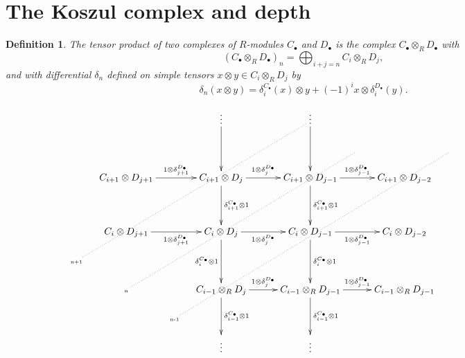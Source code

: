\documentclass[11pt]{book}
\newtheorem{definition}[theorem]{Definition}
\numberwithin{equation}{section}
\numberwithin{theorem}{chapter}
\theoremstyle{definition}
\newtheorem*{basic properties}{Basic Properties}
\newtheorem*{Important Remark}{Important Remark}
\theoremstyle{remark}
\begin{document}


\section{The Koszul complex and depth}

\begin{definition}\label{tensor product of complexes}
	The tensor product of two complexes of $R$-modules $C_\bullet$ and $D_\bullet$ is the complex $C_\bullet \otimes_R D_\bullet$ with
	$$\left( C_\bullet \otimes_R D_\bullet \right)_n = \bigoplus_{i+j = n} C_i \otimes_R D_j,$$
	and with differential $\delta_n$ defined on simple tensors $x \otimes y \in C_i \otimes_R D_j$ by
	$$\delta_{n} (x \otimes y)= \delta^{C_\bullet}_i(x) \otimes y + (-1)^i x \otimes \delta^{D_\bullet}_i(y).$$
	
	$$ 
	\xymatrix@R=6mm@C=4mm{
		&&& \vdots \ar[dd] && \vdots \ar[dd] && \\ 
		&&&&&&&&&&&&&\\
		& C_{i+1} \otimes D_{j+1} \ar[rr]^-{1 \otimes  \delta^{D_\bullet}_{j+1}} && C_{i+1} \otimes D_j \ar[rr]^-{1 \otimes  \delta^{D_\bullet}_{j}} \ar[dd]^-{\delta^{C_\bullet}_{i+1} \otimes 1} && C_{i+1} \otimes D_{j-1} \ar[rr]^-{1 \otimes  \delta^{D_\bullet}_{j-1}} \ar[dd]^-{\delta^{C_\bullet}_{i+1} \otimes 1} && C_{i+1} \otimes D_{j-2} &&&&&&  \\ 
		&&&&&&&&& \\
		& C_i \otimes D_{j+1} \ar[rr]_-{1 \otimes  \delta^{D_\bullet}_{j+1}} && C_{i} \otimes D_j \ar[rr]_-{1 \otimes  \delta^{D_\bullet}_{j}} \ar[dd]_-{\delta^{C_\bullet}_{i} \otimes 1} && C_{i} \otimes D_{j-1} \ar[rr]_-{1 \otimes  \delta^{D_\bullet}_{j-1}} \ar[dd]^-{\delta^{C_\bullet}_{i} \otimes 1} && C_{i} \otimes D_{j-2} &&&&& \\ 
		\textrm{\tiny{n+1}} \ar@{..}@[blue][uuuuurrrrr] &&&&&&& \\
		& \textrm{\tiny{n}} \ar@{..}@[blue][uuuuurrrrr] && C_{i-1} \otimes_R D_j \ar[dd]^-{\delta^{C_\bullet}_{i-1} \otimes 1} \ar[rr] ^-{1 \otimes \delta^{D_\bullet}_j} && C_{i-1} \otimes_R D_{j-1} \ar[dd]^-{\delta^{C_\bullet}_{i-1} \otimes 1} \ar[rr] ^-{1 \otimes \delta^{D_\bullet}_{j-1}} && C_{i-1} \otimes_R D_{j-1} && \\
		&& \textrm{\tiny{n-1}} \ar@{..}@[blue][uuuuururrrrr] &&&&&&& \\
		&&  & \vdots && \vdots&&&
	}
	$$
\end{definition}
\end{document}
